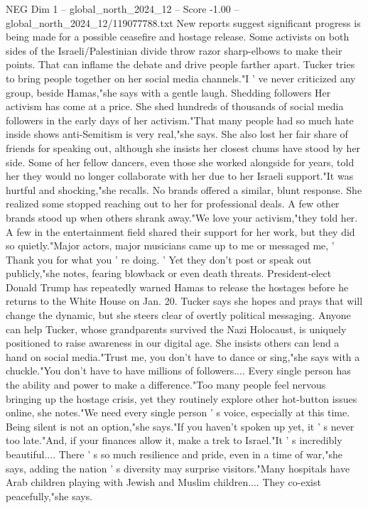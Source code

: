 \begin{textsample}{NEG Dim 1 – global\_north\_2024\_12 – Score -1.00 – global\_north\_2024\_12/119077788.txt}
New reports suggest significant progress is being made for a possible ceasefire and hostage release.
Some activists on both sides of the Israeli/Palestinian divide throw razor sharp-elbows to make their points.
That can inflame the debate and drive people farther apart.
Tucker tries to bring people together on her social media channels."I ' ve never criticized any group, beside Hamas,"she says with a gentle laugh.
Shedding followers Her activism has come at a price.
She shed hundreds of thousands of social media followers in the early days of her activism."That many people had so much hate inside shows anti-Semitism is very real,"she says.
She also lost her fair share of friends for speaking out, although she insists her closest chums have stood by her side.
Some of her fellow dancers, even those she worked alongside for years, told her they would no longer collaborate with her due to her Israeli support."It was hurtful and shocking,"she recalls.
No brands offered a similar, blunt response.
She realized some stopped reaching out to her for professional deals.
A few other brands stood up when others shrank away."We love your activism,"they told her.
A few in the entertainment field shared their support for her work, but they did so quietly."Major actors, major musicians came up to me or messaged me, ' Thank you for what you ' re doing. ' Yet they don't post or speak out publicly,"she notes, fearing blowback or even death threats.
President-elect Donald Trump has repeatedly warned Hamas to release the hostages before he returns to the White House on Jan. 20.
Tucker says she hopes and prays that will change the dynamic, but she steers clear of overtly political messaging.
Anyone can help Tucker, whose grandparents survived the Nazi Holocaust, is uniquely positioned to raise awareness in our digital age.
She insists others can lend a hand on social media."Trust me, you don't have to dance or sing,"she says with a chuckle."You don't have to have millions of followers....
Every single person has the ability and power to make a difference."Too many people feel nervous bringing up the hostage crisis, yet they routinely explore other hot-button issues online, she notes."We need every single person ' s voice, especially at this time.
Being silent is not an option,"she says."If you haven't spoken up yet, it ' s never too late."And, if your finances allow it, make a trek to Israel."It ' s incredibly beautiful....
There ' s so much resilience and pride, even in a time of war,"she says, adding the nation ' s diversity may surprise visitors."Many hospitals have Arab children playing with Jewish and Muslim children....
They co-exist peacefully,"she says.

\end{textsample}
